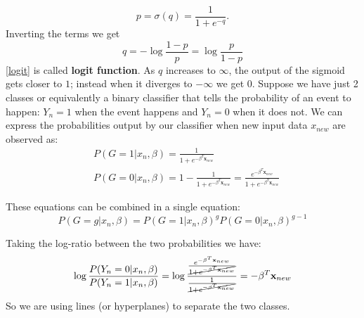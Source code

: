 \documentclass[12pt, letterpaper]{article}
\theoremstyle{definition}
\newcommand{\x}{\mathbf{x}}
\begin{document}
\begin{equation}
p=\sigma(q) = \frac{1}{1+e^{-q}}.
\end{equation}
Inverting the terms we get 
\begin{equation}
\label{logit}
q = -\log\frac{1-p}{p} = \log \frac{p}{1-p} 
\end{equation}
\autoref{logit} is called \textbf{logit function}. As $q$ increases to $\infty$, the output of the sigmoid gets closer to $1$; instead when it diverges to $-\infty$ we get $0$. Suppose we have just 2 classes or equivalently a binary classifier that tells the probability of an event to happen: $Y_n=1$ when the event happens and $Y_n=0$ when it does not. We can express the probabilities output by our classifier when new input data $x_{new}$ are observed as:
\begin{equation}
\begin{aligned}
&P(G=1|x_n, \beta) =  \frac{1}{1+e^{-\beta^T\x_{new}}}\\
&P(G=0|x_n, \beta) = 1- \frac{1}{1+e^{-\beta^T\x_{new}}} = \frac{e^{-\beta^T\x_{new}}}{1+e^{-\beta^T\x_{new}}}
\end{aligned}
\end{equation}

These equations can be combined in a single equation:
\begin{equation}
P(G=g|x_n, \beta) =  P(G=1|x_n, \beta)^{g} P(G=0|x_n, \beta)^{g-1}
\end{equation}

Taking the log-ratio between the two probabilities we have:
\begin{equation}
\begin{aligned}
\log \frac{P(Y_n=0|x_n, \beta)}{P(Y_n=1|x_n, \beta)} =  \log \frac{\frac{e^{-\beta^T\x_{new}}}{\cancel{1+e^{-\beta^T\x_{new}}}}}{\frac{1}{\cancel{1+e^{-\beta^T\x_{new}}}}} = -\beta^T\x_{new}
\end{aligned}
\end{equation}
So we are using lines (or hyperplanes) to separate the two classes.
\end{document}
